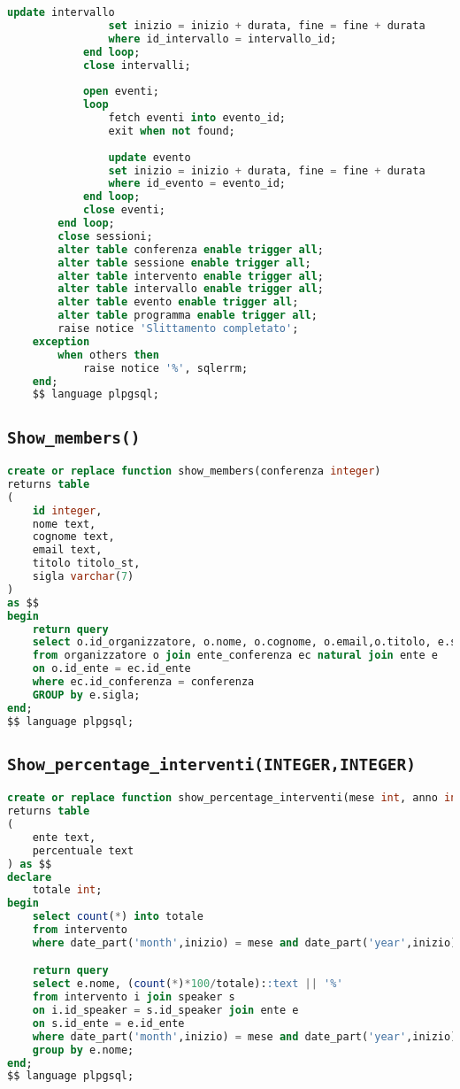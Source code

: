 \begin{lstlisting}[language=SQL,style=mystyle]
				update intervallo
				set inizio = inizio + durata, fine = fine + durata
				where id_intervallo = intervallo_id;
			end loop;
			close intervalli;
			
			open eventi;
			loop
				fetch eventi into evento_id;
				exit when not found;
	
				update evento
				set inizio = inizio + durata, fine = fine + durata
				where id_evento = evento_id;
			end loop;
			close eventi;
		end loop;
		close sessioni;
        alter table conferenza enable trigger all;
        alter table sessione enable trigger all;
        alter table intervento enable trigger all;
        alter table intervallo enable trigger all;
        alter table evento enable trigger all;
        alter table programma enable trigger all;
        raise notice 'Slittamento completato';
	exception
		when others then
			raise notice '%', sqlerrm;
	end;
	$$ language plpgsql;
\end{lstlisting}

\subsection{\texttt{Show\_members()}}
\begin{lstlisting}[language=SQL,style=mystyle]
create or replace function show_members(conferenza integer)
returns table 
(
    id integer, 
    nome text, 
    cognome text, 
    email text,
    titolo titolo_st, 
    sigla varchar(7)
) 
as $$
begin
    return query
    select o.id_organizzatore, o.nome, o.cognome, o.email,o.titolo, e.sigla
    from organizzatore o join ente_conferenza ec natural join ente e  
    on o.id_ente = ec.id_ente
    where ec.id_conferenza = conferenza
    GROUP by e.sigla;
end;
$$ language plpgsql;
\end{lstlisting}
\subsection{\texttt{Show\_percentage\_interventi(INTEGER,INTEGER)}}
\begin{lstlisting}[language=SQL,style=mystyle]
create or replace function show_percentage_interventi(mese int, anno int)
returns table
(
    ente text,
    percentuale text
) as $$
declare
    totale int;
begin
    select count(*) into totale
    from intervento
    where date_part('month',inizio) = mese and date_part('year',inizio) = anno;

    return query
    select e.nome, (count(*)*100/totale)::text || '%'
    from intervento i join speaker s 
    on i.id_speaker = s.id_speaker join ente e 
    on s.id_ente = e.id_ente
    where date_part('month',inizio) = mese and date_part('year',inizio) = anno
    group by e.nome;
end;
$$ language plpgsql;
\end{lstlisting}

